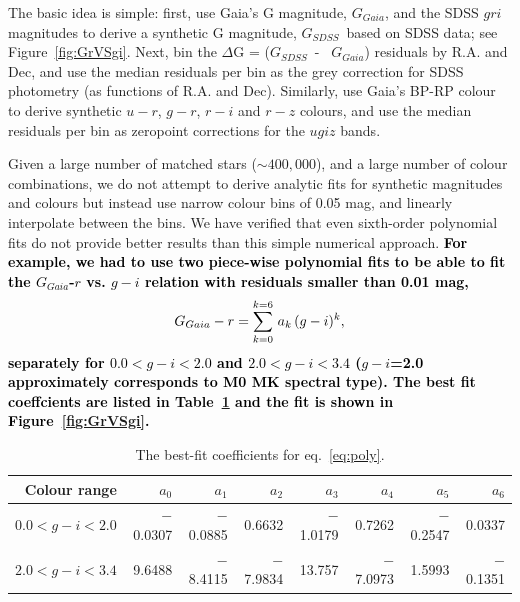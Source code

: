 \documentclass[fleqn,usenatbib]{mnras}
\newcommand{\GG}{\hbox{$G_{Gaia}$}}
\newcommand{\GS}{\hbox{$G_{SDSS}$}}
\newcommand{\RR}[1]{{\bf \textcolor{black}{#1}}} %
\begin{document}
The basic idea is simple: first, use Gaia's G magnitude, \GG, and the SDSS $gri$ magnitudes
to derive a synthetic G magnitude, \GS\ based on SDSS data; see Figure~\ref{fig:GrVSgi}.  
Next, bin the $\Delta$G = (\GS~-~ \GG) residuals by R.A. and Dec, and use the median residuals 
per bin as the grey correction for SDSS photometry (as functions of R.A. and Dec). 
Similarly, use Gaia's BP-RP colour to derive synthetic $u-r$, $g-r$, $r-i$
and $r-z$ colours, and use the median residuals per bin as zeropoint corrections for 
the $ugiz$ bands. 

Given a large number of matched stars ($\sim 400,000$), and a large number of colour combinations,
we do not attempt to derive analytic fits for synthetic magnitudes and colours but instead
use narrow colour bins of 0.05 mag, and linearly interpolate between the bins. We have verified that 
even sixth-order polynomial fits do not provide better results than this simple numerical approach. 
\RR{For example, we had to use two piece-wise polynomial fits to be able to fit the \GG-$r$ vs.
$g-i$ relation with residuals smaller than 0.01 mag, 
\begin{equation}
\label{eq:poly}
         \GG-r = \sum_{k=0}^{k=6} \, a_k\,(g-i)^k,
\end{equation}
separately for $0.0 < g-i < 2.0$ and $2.0 < g-i < 3.4$ ($g-i$=2.0 approximately corresponds to 
M0 MK spectral type). The best fit coeffcients are listed in Table~\ref{tab:poly} and the fit is shown in 
Figure~\ref{fig:GrVSgi}.}


\begin{table}
	\centering
	\caption{The best-fit coefficients for eq.~\ref{eq:poly}.}
	\label{tab:poly}
	\begin{tabular}{r|r|r|r|r|r|r|r} %
		\hline
		Colour range & $a_0$ & $a_1$ & $a_2$ & $a_3$ & $a_4$ & $a_5$ & $a_6$    \\
		\hline
        $0.0 < g-i < 2.0$ &  $-$0.0307 &  $-$0.0885 &   0.6632 &  $-$1.0179 &   0.7262 &   $-$0.2547 &   0.0337  \\
        $2.0 < g-i < 3.4$ &    9.6488 &  $-$8.4115 &  $-$7.9834 &  13.757 &  $-$7.0973 &  1.5993 &  $-$0.1351   \\
		\hline
	\end{tabular} 
\end{table}
\end{document}
